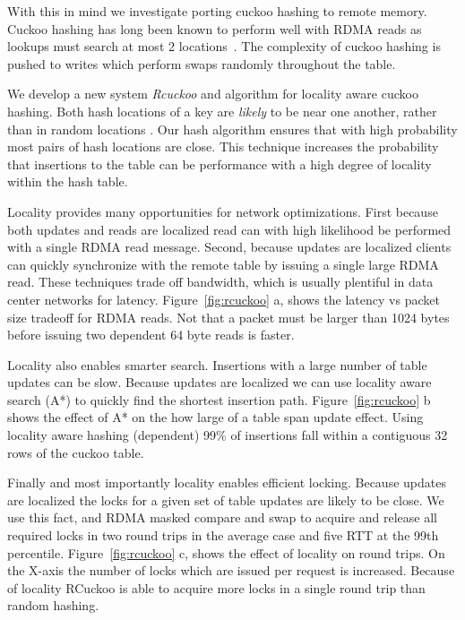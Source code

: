 With this in mind we investigate porting cuckoo hashing to
remote memory. Cuckoo hashing has long been known to perform
well with RDMA reads as lookups must search at most 2
locations~\cite{pilaf, farm}. The complexity of cuckoo
hashing is pushed to writes which perform swaps randomly
throughout the table. 

We develop a new system \textit{Rcuckoo} and algorithm for
locality aware cuckoo hashing. Both hash locations of a key
are \textit{likely} to be near one another, rather than in
random locations . Our hash algorithm ensures that with high
probability most pairs of hash locations are close.  This
technique increases the probability that insertions to the
table can be performance with a high degree of locality
within the hash table.

Locality provides many opportunities for network
optimizations. First because both updates and reads are
localized read can with high likelihood be performed with a
single RDMA read message. Second, because updates are
localized clients can quickly synchronize with the remote
table by issuing a single large RDMA read. These techniques
trade off bandwidth, which is usually plentiful in data
center networks for latency. Figure~\ref{fig:rcuckoo} a, shows
the latency vs packet size tradeoff for RDMA reads. Not that
a packet must be larger than 1024 bytes before issuing two
dependent 64 byte reads is faster.

Locality also enables smarter search. Insertions with a
large number of table updates can be slow. Because updates
are localized we can use locality aware search (A*) to
quickly find the shortest insertion path.
Figure~\ref{fig:rcuckoo} b shows the effect of A* on the how
large of a table span update effect. Using locality aware
hashing (dependent) 99\% of insertions fall within a
contiguous 32 rows of the cuckoo table.

Finally and most importantly locality enables efficient
locking. Because updates are localized the locks for a given
set of table updates are likely to be close. We use this
fact, and RDMA masked compare and swap  to
acquire and release all required locks in two round trips in
the average case and five RTT at the 99th percentile.
Figure~\ref{fig:rcuckoo} c, shows the effect of locality on
round trips. On the X-axis the number of locks which are
issued per request is increased. Because of locality RCuckoo
is able to acquire more locks in a single round trip than
random hashing.

